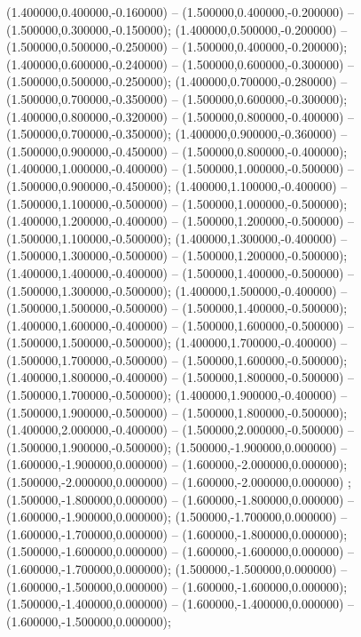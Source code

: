  (1.400000,0.400000,-0.160000) -- (1.500000,0.400000,-0.200000) -- (1.500000,0.300000,-0.150000);
 (1.400000,0.500000,-0.200000) -- (1.500000,0.500000,-0.250000) -- (1.500000,0.400000,-0.200000);
 (1.400000,0.600000,-0.240000) -- (1.500000,0.600000,-0.300000) -- (1.500000,0.500000,-0.250000);
 (1.400000,0.700000,-0.280000) -- (1.500000,0.700000,-0.350000) -- (1.500000,0.600000,-0.300000);
 (1.400000,0.800000,-0.320000) -- (1.500000,0.800000,-0.400000) -- (1.500000,0.700000,-0.350000);
 (1.400000,0.900000,-0.360000) -- (1.500000,0.900000,-0.450000) -- (1.500000,0.800000,-0.400000);
 (1.400000,1.000000,-0.400000) -- (1.500000,1.000000,-0.500000) -- (1.500000,0.900000,-0.450000);
 (1.400000,1.100000,-0.400000) -- (1.500000,1.100000,-0.500000) -- (1.500000,1.000000,-0.500000);
 (1.400000,1.200000,-0.400000) -- (1.500000,1.200000,-0.500000) -- (1.500000,1.100000,-0.500000);
 (1.400000,1.300000,-0.400000) -- (1.500000,1.300000,-0.500000) -- (1.500000,1.200000,-0.500000);
 (1.400000,1.400000,-0.400000) -- (1.500000,1.400000,-0.500000) -- (1.500000,1.300000,-0.500000);
 (1.400000,1.500000,-0.400000) -- (1.500000,1.500000,-0.500000) -- (1.500000,1.400000,-0.500000);
 (1.400000,1.600000,-0.400000) -- (1.500000,1.600000,-0.500000) -- (1.500000,1.500000,-0.500000);
 (1.400000,1.700000,-0.400000) -- (1.500000,1.700000,-0.500000) -- (1.500000,1.600000,-0.500000);
 (1.400000,1.800000,-0.400000) -- (1.500000,1.800000,-0.500000) -- (1.500000,1.700000,-0.500000);
 (1.400000,1.900000,-0.400000) -- (1.500000,1.900000,-0.500000) -- (1.500000,1.800000,-0.500000);
 (1.400000,2.000000,-0.400000) -- (1.500000,2.000000,-0.500000) -- (1.500000,1.900000,-0.500000);
 (1.500000,-1.900000,0.000000) -- (1.600000,-1.900000,0.000000) -- (1.600000,-2.000000,0.000000);
 (1.500000,-2.000000,0.000000) -- (1.600000,-2.000000,0.000000) ;
 (1.500000,-1.800000,0.000000) -- (1.600000,-1.800000,0.000000) -- (1.600000,-1.900000,0.000000);
 (1.500000,-1.700000,0.000000) -- (1.600000,-1.700000,0.000000) -- (1.600000,-1.800000,0.000000);
 (1.500000,-1.600000,0.000000) -- (1.600000,-1.600000,0.000000) -- (1.600000,-1.700000,0.000000);
 (1.500000,-1.500000,0.000000) -- (1.600000,-1.500000,0.000000) -- (1.600000,-1.600000,0.000000);
 (1.500000,-1.400000,0.000000) -- (1.600000,-1.400000,0.000000) -- (1.600000,-1.500000,0.000000);
